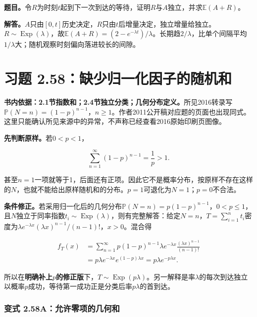 \documentclass[12pt,a4paper,UTF8,fontset=fandol]{ctexart}
\begin{document}
\textbf{题目。}令\(R\)为时刻\(t\)起到下一次到达的等待，证明\(R\)与\(A\)独立，并求\(\mathbb E(A+R)\)。

\textbf{解答。}\(A\)只由\([0,t]\)历史决定，\(R\)只由\(t\)后增量决定，独立增量给独立。\(R\sim\operatorname{Exp}(\lambda)\)，故\(\mathbb E(A+R)=(2-e^{-\lambda t})/\lambda\)。长期趋\(2/\lambda\)，比单个间隔平均\(1/\lambda\)大；随机观察时刻偏向落进较长的间隙。

\section{习题
2.58：缺少归一化因子的随机和}\label{ux4e60ux9898-2.58ux7f3aux5c11ux5f52ux4e00ux5316ux56e0ux5b50ux7684ux968fux673aux548c}

\textbf{书内依据：2.1节指数和；2.4节独立分类；几何分布定义。}所见2016转录写\(\mathbb P(N=n)=(1-p)^{n-1}\)，\(n\ge1\)。作者2011公开稿对应题的页面也出现同式。这里只能确认所见来源中的异常，不声称已经查看2016原始印刷页图像。

\textbf{先判断原样。}若\(0<p<1\)，

\[\sum_{n=1}^{\infty}(1-p)^{n-1}=\frac1p>1.\]

甚至\(n=1\)一项就等于1，后面还有正项。因此它不是概率分布，按原样不存在这样的\(N\)，也就不能给出原样随机和的分布。\(p=1\)可退化为\(N=1\)；\(p=0\)不合法。

\textbf{条件修正。}若采用归一化后的几何分布\(\mathbb P(N=n)=p(1-p)^{n-1}\)，\(0<p\le1\)，且\(N\)独立于同率指数\(t_i\sim\operatorname{Exp}(\lambda)\)，则有完整解答：给定\(N=n\)，\(T=\sum_{i=1}^nt_i\)密度为\(\lambda e^{-\lambda x}(\lambda x)^{n-1}/(n-1)!\)，\(x>0\)。混合得

\[
\begin{aligned}
f_T(x)
&=\sum_{n=1}^\infty p(1-p)^{n-1}
\lambda e^{-\lambda x}\frac{(\lambda x)^{n-1}}{(n-1)!}\\
&=p\lambda e^{-\lambda x}e^{(1-p)\lambda x}
=p\lambda e^{-p\lambda x}.
\end{aligned}
\]

所以在\textbf{明确补上\(p\)的修正版}下，\(\boxed{T\sim\operatorname{Exp}(p\lambda)}\)。另一解释是率\(\lambda\)的每次到达独立以概率\(p\)成功，等待第一成功正是分类后率\(p\lambda\)的首到达。

\subsubsection{变式
2.58A：允许零项的几何和}\label{ux53d8ux5f0f-2.58aux5141ux8bb8ux96f6ux9879ux7684ux51e0ux4f55ux548c}
\end{document}
